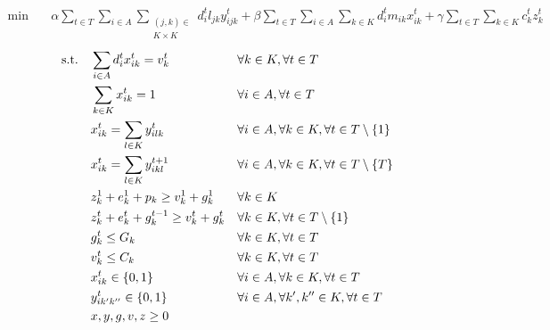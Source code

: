\begin{align}
    \min\quad       & \alpha \sum_{t \in T} \sum_{i \in A} \sum_{\substack{(j,k) \in \\ K \times K}}d^{t}_{i} l_{jk} y^t_{ijk} + \beta \sum_{t \in T} \sum_{i \in A} \sum_{k \in K}d^{t}_{i} m_{ik} x^t_{ik} + \gamma \sum_{t \in T} \sum_{k \in K}{c_k^t z_k^t}
    \label{eq:complete-obj}
\end{align}
\vspace*{-10mm}
\begin{align}
    \text{s.t.\quad}
    \label{eq:complete-c1}
    & \sum_{i \in A}{d^t_i x_{ik}^t} = v_k^t        &   & \forall k \in K, \forall t \in T                                  \\
    \label{eq:complete-c2}
    & \sum_{k \in K}{x_{ik}^t} = 1                  &   & \forall i \in A, \forall t \in T                                  \\
    \label{eq:complete-c3}
    & x_{ik}^t = \sum_{l \in K}{y_{ilk}^t}          &   & \forall i \in A, \forall k \in K, \forall t \in T \setminus \{1\} \\
    \label{eq:complete-c4}
    & x_{ik}^t = \sum_{l \in K}{y_{ikl}^{t+1}}      &   & \forall i \in A, \forall k \in K, \forall t \in T \setminus \{T\} \\
    \label{eq:complete-c5}
    & z_k^1 + e_k^1 + p_k \geq v_k^1 + g_k^1        &   & \forall k \in K                                                   \\
    \label{eq:complete-c6}
    & z_k^t + e_k^t + g_k^{t-1} \geq v_k^t + g_k^t  &   & \forall k \in K, \forall t \in T \setminus \{1\}                  \\
    \label{eq:complete-c7}
    & g_k^t \leq G_k                                &   & \forall k \in K, \forall t \in T                                  \\
    \label{eq:complete-c8}
    & v_k^t \leq C_k                                &   & \forall k \in K, \forall t \in T                                  \\
    \label{eq:complete-c9}
    & x_{ik}^t \in \{0,1\}                          &   & \forall i \in A, \forall k \in K, \forall t \in T                 \\
    \label{eq:complete-c10}
    & y_{ik'k''}^t \in \{0,1\}                      &   & \forall i \in A, \forall k', k'' \in K, \forall t \in T           \\
    \label{eq:complete-c11}
    & x, y, g, v, z \geq 0                          &   &
\end{align}
